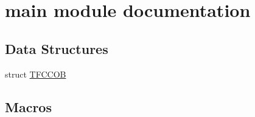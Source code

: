 \hypertarget{group__main__module}{}\section{main module documentation}
\label{group__main__module}
\subsection*{Data Structures}
\begin{DoxyCompactItemize}
\item 
struct \hyperlink{struct_t_f_c_c_o_b}{T\+F\+C\+C\+O\+B}
\end{DoxyCompactItemize}
\subsection*{Macros}

